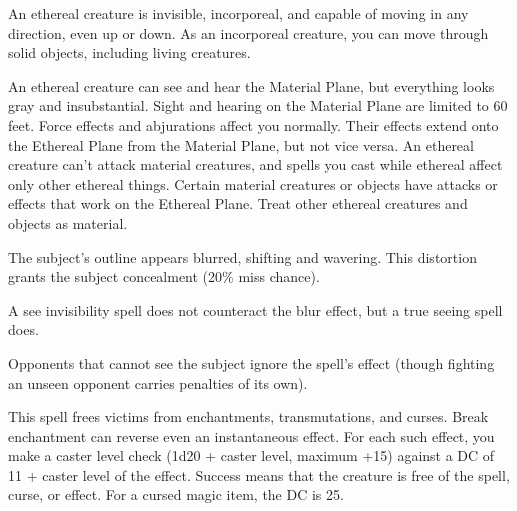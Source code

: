 \begin{multicols}{2}
\begin{small}
\smallskip\noindent An ethereal creature is invisible, incorporeal, and capable of moving in any direction, even up or down. As an incorporeal creature, you can move through solid objects, including living creatures.

\smallskip\noindent An ethereal creature can see and hear the Material Plane, but everything looks gray and insubstantial. Sight and hearing on the Material Plane are limited to 60 feet.
Force effects and abjurations affect you normally. Their effects extend onto the Ethereal Plane from the Material Plane, but not vice versa. An ethereal creature can't attack material creatures, and spells you cast while ethereal affect only other ethereal things. Certain material creatures or objects have attacks or effects that work on the Ethereal Plane. Treat other ethereal creatures and objects as material.

\noindent The subject's outline appears blurred, shifting and wavering. This distortion grants the subject concealment (20\% miss chance).

\smallskip\noindent A see invisibility spell does not counteract the blur effect, but a true seeing spell does.

\smallskip\noindent Opponents that cannot see the subject ignore the spell's effect (though fighting an unseen opponent carries penalties of its own).

\noindent This spell frees victims from enchantments, transmutations, and curses. Break enchantment can reverse even an instantaneous effect. For each such effect, you make a caster level check (1d20 + caster level, maximum +15) against a DC of 11 + caster level of the effect. Success means that the creature is free of the spell, curse, or effect. For a cursed magic item, the DC is 25.


\end{small}
\end{multicols}
